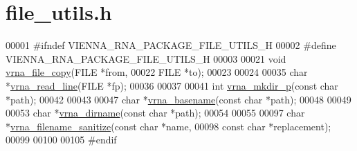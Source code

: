 \hypertarget{file__utils_8h_source}{}\section{file\+\_\+utils.\+h}
\label{file__utils_8h_source}

\begin{DoxyCode}
00001 \textcolor{preprocessor}{#ifndef VIENNA\_RNA\_PACKAGE\_FILE\_UTILS\_H}
00002 \textcolor{preprocessor}{#define VIENNA\_RNA\_PACKAGE\_FILE\_UTILS\_H}
00003 
00021 \textcolor{keywordtype}{void} \hyperlink{group__file__utils_ga4382a56d2fee9ed738364b99329edc7c}{vrna\_file\_copy}(FILE  *from,
00022                     FILE  *to);
00023 
00024 
00035 \textcolor{keywordtype}{char} *\hyperlink{group__file__utils_gad16c270b70a77c753088b29de8a802dc}{vrna\_read\_line}(FILE *fp);
00036 
00037 
00041 \textcolor{keywordtype}{int} \hyperlink{group__file__utils_gacfa44a974272a4d42c5d391cc780a0ec}{vrna\_mkdir\_p}(\textcolor{keyword}{const} \textcolor{keywordtype}{char} *path);
00042 
00043 
00047 \textcolor{keywordtype}{char} *\hyperlink{group__file__utils_ga8d0f8f84f1e2628172cf3c8648b2e507}{vrna\_basename}(\textcolor{keyword}{const} \textcolor{keywordtype}{char} *path);
00048 
00049 
00053 \textcolor{keywordtype}{char} *\hyperlink{group__file__utils_gae006d31b088d52d8aace86948def5fe8}{vrna\_dirname}(\textcolor{keyword}{const} \textcolor{keywordtype}{char} *path);
00054 
00055 
00097 \textcolor{keywordtype}{char} *\hyperlink{group__file__utils_ga72eae0a472bad905b6facccf5b453a76}{vrna\_filename\_sanitize}(\textcolor{keyword}{const} \textcolor{keywordtype}{char} *name,
00098                              \textcolor{keyword}{const} \textcolor{keywordtype}{char} *replacement);
00099 
00100 
00105 \textcolor{preprocessor}{#endif}
\end{DoxyCode}
